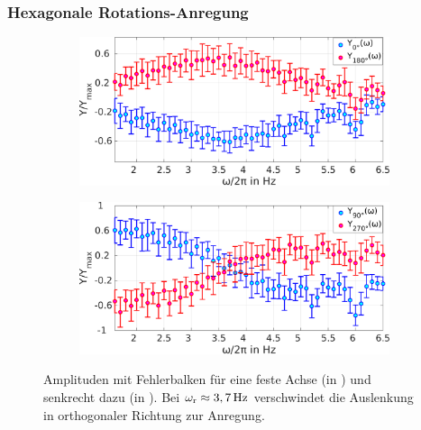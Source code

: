         \subsubsection*{Hexagonale Rotations-Anregung}

            \begin{figure}[!t]
              \begin{subfigure}{0.49\textwidth}
                \centering
                \includegraphics[width=\textwidth,height=0.6\textwidth]{figs/auswertung/phasen/rotamplitude0180.png}
                \caption{}
              \end{subfigure}
              \begin{subfigure}{0.49\textwidth}
                \centering
                \includegraphics[width=\textwidth,height=0.6\textwidth]{figs/auswertung/phasen/rotamplitude90270.png}
                \caption{}
              \end{subfigure}
              \caption{Amplituden mit Fehlerbalken für eine feste Achse (in ) und senkrecht dazu (in ). Bei $\omega\ix{r}\approx\unit[3,7]{Hz}$ verschwindet die Auslenkung in orthogonaler Richtung zur Anregung.}\label{img:hexarotamp}
              \vspace{-0.5cm}
            \end{figure}

